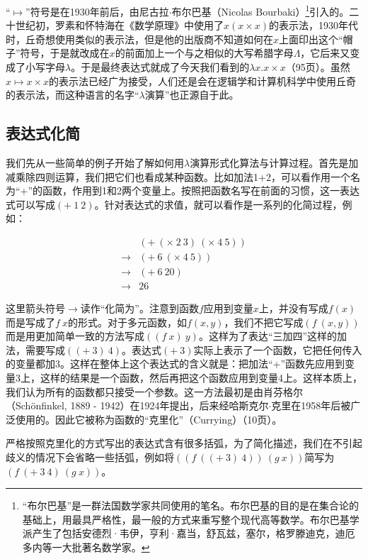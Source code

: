 \documentclass[UTF8]{article}
\begin{document}
“$\mapsto$”符号是在1930年前后，由尼古拉$\cdot$布尔巴基（Nicolas Bourbaki）\footnote{“布尔巴基”是一群法国数学家共同使用的笔名。布尔巴基的目的是在集合论的基础上，用最具严格性，最一般的方式来重写整个现代高等数学。布尔巴基学派产生了包括安德烈·韦伊，亨利·嘉当，舒瓦兹，塞尔，格罗滕迪克，迪厄多内等一大批著名数学家。}引入的。二十世纪初，罗素和怀特海在《数学原理》中使用了$\hat{x}(x \times x)$的表示法，1930年代时，丘奇想使用类似的表示法，但是他的出版商不知道如何在$x$上面印出这个“帽子”符号，于是就改成在$x$的前面加上一个与之相似的大写希腊字母$\Lambda$，它后来又变成了小写字母$\lambda$。于是最终表达式就成了今天我们看到的$\lambda x . x \times x$\cite{Dowek2011}（95页）。虽然$x \mapsto x \times x$的表示法已经广为接受，人们还是会在逻辑学和计算机科学中使用丘奇的表示法，而这种语言的名字“$\lambda$演算”也正源自于此。

\subsection{表达式化简}
我们先从一些简单的例子开始了解如何用$\lambda$演算形式化算法与计算过程。首先是加减乘除四则运算，我们把它们也看成某种函数。比如加法1+2，可以看作用一个名为“+”的函数，作用到1和2两个变量上。按照把函数名写在前面的习惯，这一表达式可以写成$(+\ 1\ 2)$。针对表达式的求值，就可以看作是一系列的化简过程，例如：

\[
\begin{array}{ll}
    & (+\ (\times\ 2\ 3)\ (\times\ 4\ 5)) \\
\to & (+\ 6\ (\times\ 4\ 5)) \\
\to & (+\ 6\ 20) \\
\to & 26
\end{array}
\]

这里箭头符号$\to$读作“化简为”。注意到函数$f$应用到变量$x$上，并没有写成$f(x)$而是写成了$f\ x$的形式。对于多元函数，如$f(x, y)$，我们不把它写成$(f\ (x, y))$而是用更加简单一致的方法写成$((f\ x)\ y)$。这样为了表达“三加四”这样的加法，需要写成$((+\ 3)\ 4)$。表达式$(+\ 3)$实际上表示了一个函数，它把任何传入的变量都加3。这样在整体上这个表达式的含义就是：把加法“+”函数先应用到变量3上，这样的结果是一个函数，然后再把这个函数应用到变量4上。这样本质上，我们认为所有的函数都只接受一个参数。这一方法最初是由肖芬格尔（Schönfinkel, 1889 - 1942）在1924年提出，后来经哈斯克尔$\cdot$克里在1958年后被广泛使用的。因此它被称为函数的“克里化”（Currying）\cite{SPJ1987}（10页）。

严格按照克里化的方式写出的表达式含有很多括弧，为了简化描述，我们在不引起歧义的情况下会省略一些括弧，例如将$((f\ ((+\ 3)\ 4))\ (g\ x))$简写为$(f\ (+\ 3\ 4)\ (g\ x))$。
\end{document}

